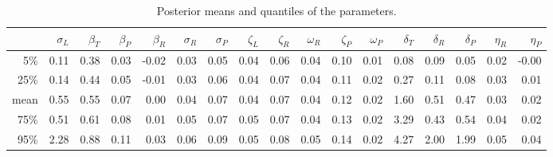 \documentclass[12pt]{article}
\begin{document}
\begin{table}[ht]
    \footnotesize
\centering
\begin{tabular}{rrrrrrrrrrrrrrrrr}
  \hline
        &  $\sigma_L$  &  $\beta_T$  &  $\beta_P$  &  $\beta_R$  &  $\sigma_R$  &  $\sigma_P$  &  $\zeta_L$  &  $\zeta_R$  &  $\omega_R$  &  $\zeta_P$  &  $\omega_P$  &  $\delta_T$  &  $\delta_R$  &  $\delta_P$  &  $\eta_R$  &  $\eta_P$  \\
\hline
5\%     &  0.11        &  0.38       &  0.03       &  -0.02      &  0.03        &  0.05        &  0.04       &  0.06       &  0.04        &  0.10       &  0.01        &  0.08        &  0.09        &  0.05        &  0.02      &  -0.00     \\
25\%    &  0.14        &  0.44       &  0.05       &  -0.01      &  0.03        &  0.06        &  0.04       &  0.07       &  0.04        &  0.11       &  0.02        &  0.27        &  0.11        &  0.08        &  0.03      &  0.01      \\
mean    &  0.55        &  0.55       &  0.07       &  0.00       &  0.04        &  0.07        &  0.04       &  0.07       &  0.04        &  0.12       &  0.02        &  1.60        &  0.51        &  0.47        &  0.03      &  0.02      \\
75\%    &  0.51        &  0.61       &  0.08       &  0.01       &  0.05        &  0.07        &  0.05       &  0.07       &  0.04        &  0.13       &  0.02        &  3.29        &  0.43        &  0.54        &  0.04      &  0.02      \\
95\%    &  2.28        &  0.88       &  0.11       &  0.03       &  0.06        &  0.09        &  0.05       &  0.08       &  0.05        &  0.14       &  0.02        &  4.27        &  2.00        &  1.99        &  0.05      &  0.04      \\
   \hline
\end{tabular}
\caption{ \label{tab:posterior_distrns} Posterior means and quantiles of the parameters.  }
\end{table}
\end{document}
